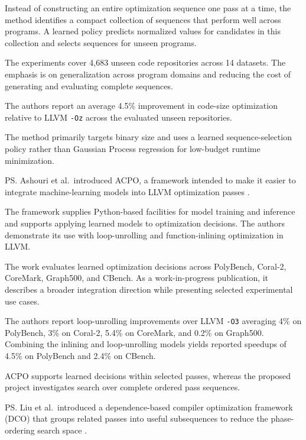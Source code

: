 \me{} Instead of constructing an entire optimization sequence one pass at a time, the method identifies a compact collection of sequences that perform well across programs. A learned policy predicts normalized values for candidates in this collection and selects sequences for unseen programs.

The experiments cover 4,683 unseen code repositories across 14 datasets. The emphasis is on generalization across program domains and reducing the cost of generating and evaluating complete sequences.

\re{} The authors report an average 4.5\% improvement in code-size optimization relative to LLVM \texttt{-Oz} across the evaluated unseen repositories.

\rg{} The method primarily targets binary size and uses a learned sequence-selection policy rather than Gaussian Process regression for low-budget runtime minimization.

\ps{} Ashouri et al.\ introduced ACPO, a framework intended to make it easier to integrate machine-learning models into LLVM optimization passes \cite{ashouri2024acpo}.

\me{} The framework supplies Python-based facilities for model training and inference and supports applying learned models to optimization decisions. The authors demonstrate its use with loop-unrolling and function-inlining optimization in LLVM.

The work evaluates learned optimization decisions across PolyBench, Coral-2, CoreMark, Graph500, and CBench. As a work-in-progress publication, it describes a broader integration direction while presenting selected experimental use cases.

\re{} The authors report loop-unrolling improvements over LLVM \texttt{-O3} averaging 4\% on PolyBench, 3\% on Coral-2, 5.4\% on CoreMark, and 0.2\% on Graph500. Combining the inlining and loop-unrolling models yields reported speedups of 4.5\% on PolyBench and 2.4\% on CBench.

\rg{} ACPO supports learned decisions within selected passes, whereas the proposed project investigates search over complete ordered pass sequences.

\ps{} Liu et al.\ introduced a dependence-based compiler optimization framework (DCO) that groups related passes into useful subsequences to reduce the phase-ordering search space \cite{liu2024dco}.

